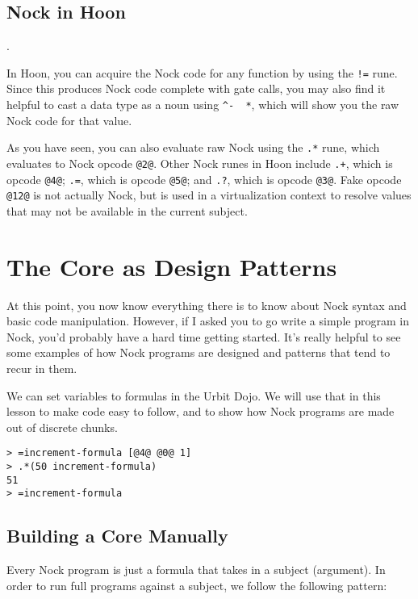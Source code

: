 \documentclass[twoside]{article}
\begin{document}
\subsection{Nock in Hoon}.

In Hoon, you can acquire the Nock code for any function by using the \lstinline[style=inlinecode]{!=} rune.  Since this produces Nock code complete with gate calls, you may also find it helpful to cast a data type as a noun using \lstinline[style=inlinecode]{^-  *}, which will show you the raw Nock code for that value.

As you have seen, you can also evaluate raw Nock using the \lstinline[style=inlinecode]{.*} rune, which evaluates to Nock opcode \lstinline[style=inlinecode]{@2@}.  Other Nock runes in Hoon include \lstinline[style=inlinecode]{.+}, which is opcode \lstinline[style=inlinecode]{@4@}; \lstinline[style=inlinecode]{.=}, which is opcode \lstinline[style=inlinecode]{@5@}; and \lstinline[style=inlinecode]{.?}, which is opcode \lstinline[style=inlinecode]{@3@}.  Fake opcode \lstinline[style=inlinecode]{@12@} is not actually Nock, but is used in a virtualization context to resolve values that may not be available in the current subject.

\section{The Core as Design Patterns}

At this point, you now know everything there is to know about Nock syntax and basic code manipulation.  However, if I asked you to go write a simple program in Nock, you'd probably have a hard time getting started. It's really helpful to see some examples of how Nock programs are designed and patterns that tend to recur in them.

We can set variables to formulas in the Urbit Dojo. We will use that in this lesson to make code easy to follow, and to show how Nock programs are made out of discrete chunks.

\begin{lstlisting}[style=listingcode]
> =increment-formula [@4@ @0@ 1]
> .*(50 increment-formula)
51
> =increment-formula
\end{lstlisting}

\subsection{Building a Core Manually}

Every Nock program is just a formula that takes in a subject (argument). In order to run full programs against a subject, we follow the following pattern:
\end{document}

